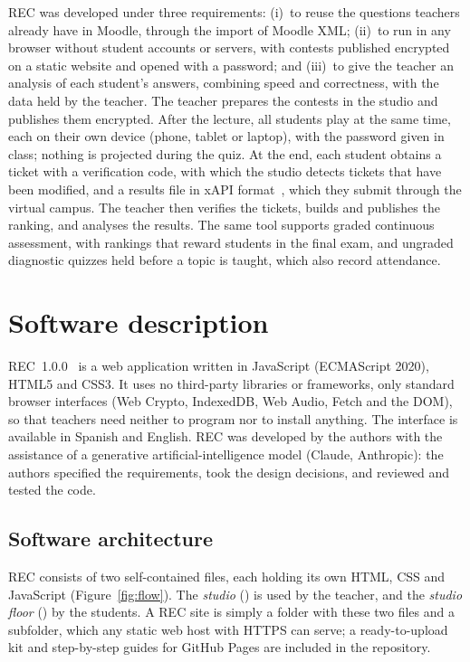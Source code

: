 \documentclass[preprint,12pt, a4paper]{elsarticle}
\begin{document}
REC was developed under three requirements: (i)~to reuse the questions teachers already have in Moodle, through the import of Moodle XML; (ii)~to run in any browser without student accounts or servers, with contests published encrypted on a static website and opened with a password; and (iii)~to give the teacher an analysis of each student's answers, combining speed and correctness, with the data held by the teacher. The teacher prepares the contests in the studio and publishes them encrypted. After the lecture, all students play at the same time, each on their own device (phone, tablet or laptop), with the password given in class; nothing is projected during the quiz. At the end, each student obtains a ticket with a verification code, with which the studio detects tickets that have been modified, and a results file in xAPI format~\cite{xapi}, which they submit through the virtual campus. The teacher then verifies the tickets, builds and publishes the ranking, and analyses the results. The same tool supports graded continuous assessment, with rankings that reward students in the final exam, and ungraded diagnostic quizzes held before a topic is taught, which also record attendance.

\section{Software description}
\label{sec:description}

REC~1.0.0~\cite{rec} is a web application written in JavaScript (ECMAScript 2020), HTML5 and CSS3. It uses no third-party libraries or frameworks, only standard browser interfaces (Web Crypto, IndexedDB, Web Audio, Fetch and the DOM), so that teachers need neither to program nor to install anything. The interface is available in Spanish and English. REC was developed by the authors with the assistance of a generative artificial-intelligence model (Claude, Anthropic): the authors specified the requirements, took the design decisions, and reviewed and tested the code.

\subsection{Software architecture}
\label{sec:architecture}

REC consists of two self-contained files, each holding its own HTML, CSS and JavaScript (Figure~\ref{fig:flow}). The \emph{studio} () is used by the teacher, and the \emph{studio floor} () by the students. A REC site is simply a folder with these two files and a  subfolder, which any static web host with HTTPS can serve; a ready-to-upload kit and step-by-step guides for GitHub Pages are included in the repository.
\end{document}
